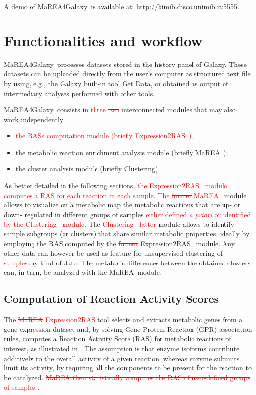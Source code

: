 \documentclass[preprint,12pt,authoryear]{elsarticle}
\newcommand{\red}{\textcolor{red}}
\newcommand{\mareagalaxy}{\textsf{MaREA4Galaxy}}
\newcommand{\mareaTool}{\textsf{MaREA}}
\newcommand{\clusterTool}{\textsf{Clustering}}
\newcommand{\RASTool}{\textsf{Expression2RAS}}
\begin{document}
A demo of \mareagalaxy\ is available at: \url{http://bimib.disco.unimib.it:5555}.

 
 \section{Functionalities and workflow}

\mareagalaxy\ processes datasets stored in the history panel of Galaxy. These datasets can be uploaded directly from the user's computer as structured text file by using, e.g., the Galaxy built-in tool Get Data, or obtained as output of intermediary analyses performed with other tools.
 
\mareagalaxy\ consists in \red{three \sout{two}} interconnected modules that may also work independently:
\begin{itemize}
    \item \red{the RASs computation module (briefly \RASTool~)};
    \item the metabolic reaction enrichment analysis module (briefly \mareaTool~); 
    \item the cluster analysis module (briefly \clusterTool).
\end{itemize}

As better detailed in the following sections, \red{the \RASTool~ module computes a RAS for each reaction in each sample. The \sout{former} \mareaTool~} module allows to visualize on a metabolic map the metabolic reactions that are up- or down- regulated in different groups of samples \red{either defined \textit{a priori} or identified by the \clusterTool~ module}. The \red{\clusterTool~ \sout{latter}} module allows to identify sample subgroups (or clusters) that share similar metabolic properties, ideally by employing the RAS computed by the \red{\sout{former}} \RASTool~ module. Any other data can however be used as feature for unsupervised clustering of \textcolor{red}{samples}\sout{any kind of data}. The metabolic differences between the obtained clusters can, in turn, be analyzed with the \mareaTool~module. 

\subsection{Computation of Reaction Activity Scores}
The \red{\sout{\mareaTool} \RASTool} tool selects and extracts metabolic genes from a gene-expression dataset and, by solving Gene-Protein-Reaction (GPR) association rules, computes a Reaction Activity Score (RAS) for metabolic reactions of interest, as illustrated in \citep{marea}. The assumption is that enzyme isoforms contribute additively to the overall activity of a given reaction, whereas enzyme subunits limit its activity, by requiring all the components to be present for the reaction to be catalyzed. 
\red{\sout{\textsf{MaREA} then statistically compares the RAS of user-defined groups of samples}} \citep{marea}.
\end{document}
